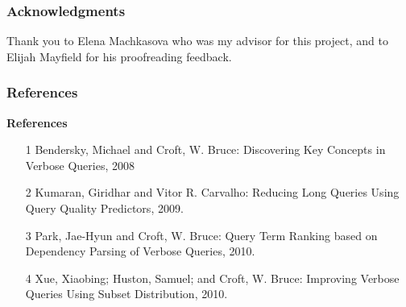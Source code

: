 \documentclass{beamer}
\begin{document}
\begin{frame}[fragile]\frametitle{Acknowledgments}
Thank you to Elena Machkasova who was my advisor for this project, and to Elijah Mayfield for his proofreading feedback.
\end{frame}


\begin{frame}[fragile]\frametitle{References}
\textbf{References} \vspace*{1cm}
\begin{itemize}
\item [1] Bendersky, Michael and Croft, W. Bruce: Discovering Key Concepts in Verbose Queries, 2008
\item [2] Kumaran, Giridhar and Vitor R. Carvalho: Reducing Long Queries Using Query Quality Predictors, 2009.
\item [3] Park, Jae-Hyun and Croft, W. Bruce: Query Term Ranking based on Dependency Parsing of Verbose Queries, 2010.
\item [4] Xue, Xiaobing; Huston, Samuel; and Croft, W. Bruce: Improving Verbose Queries Using Subset Distribution, 2010.
\end{itemize}
\end{frame}
\end{document}
